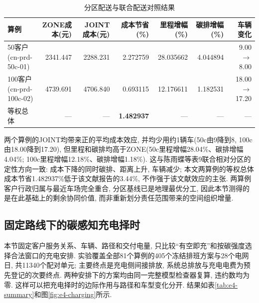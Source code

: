 \documentclass{setp-new}
\newcommand{\setptabsetup}{\fontsize{9pt}{10.5pt}\selectfont\renewcommand{\arraystretch}{0.95}\setlength{\tabcolsep}{2.2pt}\setlength{\aboverulesep}{0.4pt}\setlength{\belowrulesep}{0.4pt}\hbadness=10000}
\begin{document}
\begin{table}[H]
\centering
\caption{分区配送与联合配送对照结果}
\label{tab:e3-summary}
\setptabsetup
\begin{tabular*}{\linewidth}{@{\extracolsep{\fill}}lrrrrrr@{}}
\toprule
算例 & ZONE成本(元) & JOINT成本(元) & 成本节省(\%) & 里程增幅(\%) & 碳排增幅(\%) & 车辆变化\\
\midrule
50客户(cn-prd-50c-01) & 2341.447 & 2288.231 & 2.272759 & 28.035662 & 4.044894 & 9.00$\to$8.00 \\
100客户(cn-prd-100c-02) & 4739.691 & 4706.840 & 0.693115 & 12.176611 & 1.182531 & 18.00$\to$17.20 \\
\midrule
等权总体 & --- & --- & \textbf{1.482937} & --- & --- & ---\\
\bottomrule
\end{tabular*}
\end{table}

两个算例的JOINT均带来正的平均成本效应, 并均少用约1辆车(50c由9降到8, 100c由18.00降到17.20),
但里程和碳排均高于ZONE(50c里程增幅28.04\%、碳排增幅4.04\%; 100c里程增幅12.18\%、碳排增幅1.18\%).
这与陈雨蝶等\cite{ref:48}表9联合相对分区的定性方向一致: 成本下降的同时碳排、距离上升, 车辆减少;
本文两算例的等权总体成本节省1.482937\%低于该文献报告的3.44\%, 不作强于该文献效应的主张.
两算例客户行政归属与最近车场完全重合, 分区基线已是地理最优分工,
因此本节测得的是在此基础上的剩余协同价值, 而非重新划分责任范围带来的空间组织增量.

\subsection{固定路线下的碳感知充电择时}

本节固定客户服务关系、车辆、路径和交付电量,
只比较“有空即充”和按碳强度选择合法窗口的充电安排.
实验覆盖全部81个算例的405个冻结排班方案与28个电网日, 共11340个配对单元;
主要终点是充电侧间接排放, 系统总排放与充电电费为预先登记的次要终点.
两种安排下的方案均由同一完整模型检查器复算, 违约数均为零.
这样可以把充电择时的边际作用与路径和车型变化分开.
结果如表\ref{tab:e4-summary}和图\ref{fig:e4-charging}所示.
\end{document}
